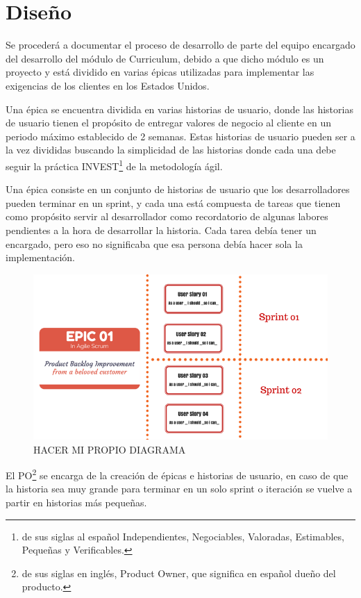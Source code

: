 \section{Diseño}
Se procederá a documentar el proceso de desarrollo de parte del equipo encargado del desarrollo del módulo de Curriculum, debido a que dicho módulo es un proyecto y está dividido en varias épicas utilizadas para implementar las exigencias de los clientes en los Estados Unidos.

Una épica se encuentra dividida en varias historias de usuario, donde las historias de usuario tienen el propósito de entregar valores de negocio al cliente en un periodo máximo establecido de 2 semanas. Estas historias de usuario pueden ser a la vez divididas buscando la simplicidad de las historias donde cada una debe seguir la práctica INVEST\footnote{de sus siglas al español Independientes, Negociables, Valoradas, Estimables, Pequeñas y Verificables.} de la metodología ágil.

Una épica consiste en un conjunto de historias de usuario que los desarrolladores pueden terminar en un sprint, y cada una está compuesta de tareas que tienen como propósito servir al desarrollador como recordatorio de algunas labores pendientes a la hora de desarrollar la historia. Cada tarea debía tener un encargado, pero eso no significaba que esa persona debía hacer sola la implementación.

\begin{figure}[H]
\centering
\includegraphics[width=125mm,scale=1]{Figuras/proceso/epic}
\caption{HACER MI PROPIO DIAGRAMA}
  \label{epic}
\end{figure}

El PO\footnote{de sus siglas en inglés, Product Owner, que significa en español dueño del producto.} se encarga de la creación de épicas e historias de usuario, en caso de que la historia sea muy grande para terminar en un solo sprint o iteración se vuelve a partir en historias más pequeñas. 


